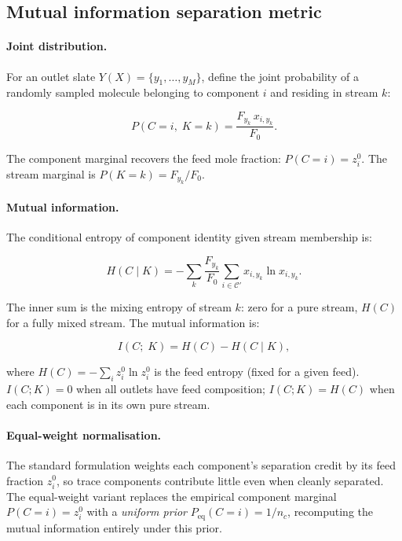 \documentclass[11pt,a4paper]{article}
\theoremstyle{definition}
\theoremstyle{plain}
\newcommand{\calC}{\mathcal{C}}
\begin{document}
\subsection{Mutual information separation metric}
\label{sec:mi_metric}

\paragraph{Joint distribution.}
For an outlet slate $Y(X) = \{y_1,\ldots,y_M\}$, define the joint probability of a randomly sampled molecule belonging to component $i$ and residing in stream $k$:

\begin{equation}
 P(C=i,\; K=k)
 = \frac{F_{y_k}\, x_{i,y_k}}{F_0}.
 \label{eq:joint_dist}
\end{equation}

The component marginal recovers the feed mole fraction: $P(C=i) = z_i^0$. The stream marginal is $P(K=k) = F_{y_k}/F_0$.

\paragraph{Mutual information.}
The conditional entropy of component identity given stream membership is:

\begin{equation}
 H(C \mid K)
 = -\sum_k \frac{F_{y_k}}{F_0}
  \sum_{i \in \calC'} x_{i,y_k} \ln x_{i,y_k}.
\end{equation}

The inner sum is the mixing entropy of stream $k$: zero for a pure stream, $H(C)$ for a fully mixed stream. The mutual information is:

\begin{equation}
 I(C;\; K) = H(C) - H(C \mid K),
 \label{eq:MI}
\end{equation}

where $H(C) = -\sum_i z_i^0 \ln z_i^0$ is the feed entropy (fixed for a given feed). $I(C;K) = 0$ when all outlets have feed composition; $I(C;K) = H(C)$ when each component is in its own pure stream.

\paragraph{Equal-weight normalisation.}
The standard formulation weights each component's separation credit by its feed fraction $z_i^0$, so trace components contribute little even when cleanly separated. The equal-weight variant replaces the empirical component marginal $P(C=i) = z_i^0$ with a \emph{uniform prior} $P_{\mathrm{eq}}(C=i) = 1/n_c$, recomputing the mutual information entirely under this prior.
\end{document}
